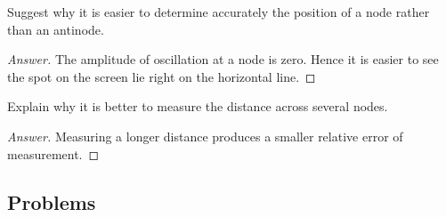 \begin{exercise}{}{}
Suggest why it is easier to determine accurately the position of a node rather than an antinode.
\end{exercise}
\begin{proof}[Answer]
The amplitude of oscillation at a node is zero. Hence it is easier to see the spot on the screen lie right on the horizontal line.
\end{proof}

\begin{exercise}{}{}
Explain why it is better to measure the distance across several nodes.
\end{exercise}
\begin{proof}[Answer]
Measuring a longer distance produces a smaller relative error of measurement.
\end{proof}

\pagebreak

\subsection*{Problems}
\pagebreak